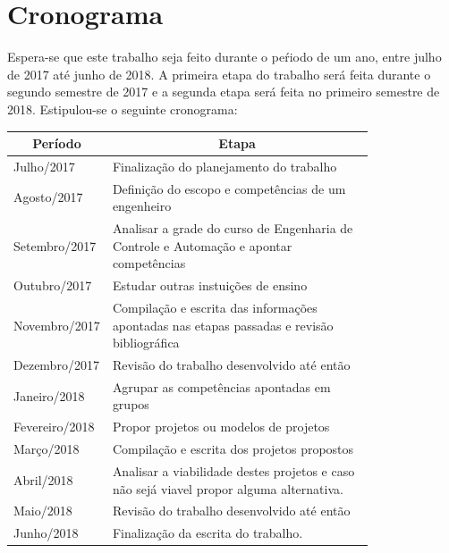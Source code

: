 \documentclass[12pt]{article} %
\begin{document}
\section{Cronograma}

Espera-se que este trabalho seja feito durante o peŕiodo de um ano, entre julho de 2017 até junho de 2018. A primeira etapa do trabalho será feita durante o segundo semestre de 2017 e a segunda etapa será feita no primeiro semestre de 2018. Estipulou-se o seguinte cronograma:

\begin{table}[H]
\centering
\begin{tabular}{|l|p{0.8\linewidth}|}
\hline
\multicolumn{1}{|c|}{\textbf{Período}} & \multicolumn{1}{c|}{\textbf{Etapa}}                                                   \tabularnewline \hline
Julho/2017                                              & Finalização do planejamento do trabalho
\tabularnewline \hline
Agosto/2017                                           & Definição do escopo e competências de um engenheiro
\tabularnewline \hline
Setembro/2017                                       & Analisar a grade do curso de Engenharia de Controle e Automação e apontar competências
\tabularnewline \hline
Outubro/2017                      		& Estudar outras instuições de ensino
\tabularnewline \hline
Novembro/2017                      		& Compilação e escrita das informações apontadas nas etapas passadas e revisão bibliográfica                                                                                                     \tabularnewline \hline	
Dezembro/2017                                       & Revisão do trabalho desenvolvido até então
\tabularnewline \hline
Janeiro/2018                                           & Agrupar as competências apontadas em grupos
\tabularnewline \hline
Fevereiro/2018                                       & Propor projetos ou modelos de projetos
\tabularnewline \hline
Março/2018                                             & Compilação e escrita dos projetos propostos
\tabularnewline \hline
Abril/2018                                            	& Analisar a viabilidade destes projetos e caso não sejá viavel propor alguma alternativa.
\tabularnewline \hline
Maio/2018                                            	& Revisão do trabalho desenvolvido até então
\tabularnewline \hline
Junho/2018                                            	& Finalização da escrita do trabalho.

\tabularnewline \hline
\end{tabular}
\end{table}
\end{document}
